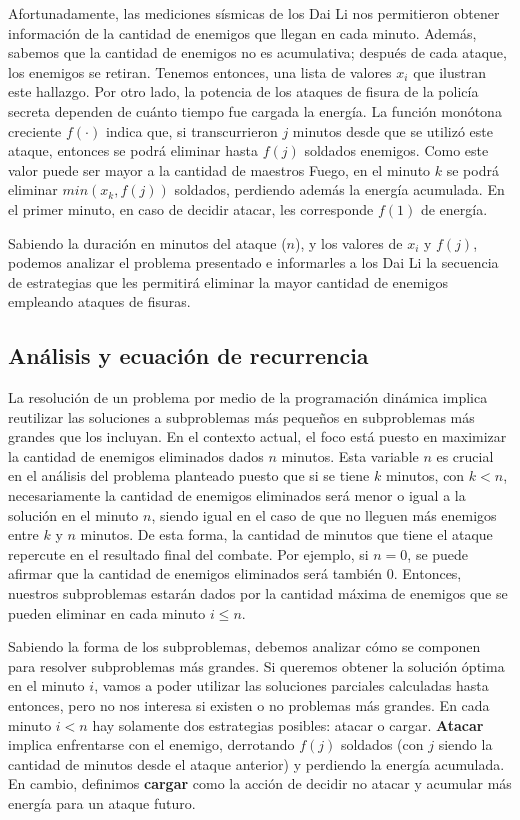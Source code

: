 \documentclass{article}
\begin{document}
Afortunadamente, las mediciones sísmicas de los Dai Li nos permitieron obtener información de la cantidad de enemigos que llegan en cada minuto. Además, sabemos que la cantidad de enemigos no es acumulativa; después de cada ataque, los enemigos se retiran. Tenemos entonces, una lista de valores $x_i$ que ilustran este hallazgo. Por otro lado, la potencia de los ataques de fisura de la policía secreta dependen de cuánto tiempo fue cargada la energía. La función monótona creciente $f(\cdot)$ indica que, si transcurrieron $j$ minutos desde que se utilizó este ataque, entonces se podrá eliminar hasta  $f(j)$ soldados enemigos. Como este valor puede ser mayor a la cantidad de maestros Fuego, en el minuto $k$ se podrá eliminar $min(x_k, f(j))$ soldados, perdiendo además la energía acumulada. En el primer minuto, en caso de decidir atacar, les corresponde $f(1)$ de energía.

Sabiendo la duración en minutos del ataque ($n$), y los valores de $x_i$ y $f(j)$, podemos analizar el problema presentado e informarles a los Dai Li la secuencia de estrategias que les permitirá eliminar la mayor cantidad de enemigos empleando ataques de fisuras.

\subsection{Análisis y ecuación de recurrencia}
\label{sec:analisis}

La resolución de un problema por medio de la programación dinámica implica reutilizar las soluciones a subproblemas más pequeños en subproblemas más grandes que los incluyan. En el contexto actual, el foco está puesto en maximizar la cantidad de enemigos eliminados dados $n$ minutos. Esta variable $n$ es crucial en el análisis del problema planteado puesto que si se tiene $k$ minutos, con $k < n$, necesariamente la cantidad de enemigos eliminados será menor o igual a la solución en el minuto $n$, siendo igual en el caso de que no lleguen más enemigos entre $k$ y $n$ minutos. De esta forma, la cantidad de minutos que tiene el ataque repercute en el resultado final del combate. Por ejemplo, si $n = 0$, se puede afirmar que la cantidad de enemigos eliminados será también 0. Entonces, nuestros subproblemas estarán dados por la cantidad máxima de enemigos que se pueden eliminar en cada minuto $i \leq n$.

Sabiendo la forma de los subproblemas, debemos analizar cómo se componen para resolver subproblemas más grandes. Si queremos obtener la solución óptima en el minuto $i$, vamos a poder utilizar las soluciones parciales calculadas hasta entonces, pero no nos interesa si existen o no problemas más grandes. En cada minuto $i < n$ hay solamente dos estrategias posibles: atacar o cargar. \textbf{Atacar} implica enfrentarse con el enemigo, derrotando $f(j)$ soldados (con $j$ siendo la cantidad de minutos desde el ataque anterior) y perdiendo la energía acumulada. En cambio, definimos \textbf{cargar} como la acción de decidir no atacar y acumular más energía para un ataque futuro. 
\end{document}
